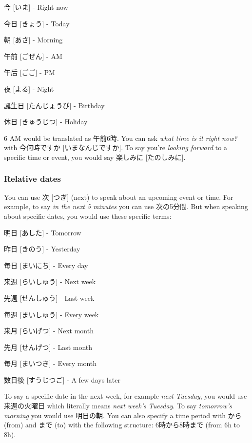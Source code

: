 \documentclass{article}
\begin{document}
\begin{CJK}{UTF8}{min}
\begin{multicols*}{3}
\begin{colorize}
\item 今 [いま] - Right now
\item 今日 [きょう] - Today
\item 朝 [あさ] - Morning
\item 午前 [ごぜん] - AM
\item 午后 [ごご] - PM
\item 夜 [よる] - Night
\item 誕生日 [たんじょうび] - Birthday
\item 休日 [きゅうじつ] - Holiday
\end{colorize}

6 AM would be translated as 午前6時. You can ask \textit{what time is it right now?} with 今何時ですか [いまなんじですか]. To say you're \textit{looking forward} to a specific time 
or event, you would say 楽しみに [たのしみに].

\subsubsection{Relative dates}

You can use 次 [つぎ] (next) to speak about an upcoming event or time. For example, to say \textit{in the next 5 minutes} you can use 次の5分間. But when speaking about specific 
dates, you would use these specific terms:

\begin{colorize}
\item 明日 [あした] - Tomorrow
\item 昨日 [きのう] - Yesterday
\item 毎日 [まいにち] - Every day
\item 来週 [らいしゅう] - Next week
\item 先週 [せんしゅう] - Last week
\item 毎週 [まいしゅう] - Every week
\item 来月 [らいげつ] - Next month
\item 先月 [せんげつ] - Last month
\item 毎月 [まいつき] - Every month
\item 数日後 [すうじつご] - A few days later
\end{colorize}

To say a specific date in the next week, for example \textit{next Tuesday}, you would use 来週の火曜日 which literally means \textit{next week's Tuesday}. To say \textit{tomorrow's 
morning} you would use 明日の朝. You can also specify a time period with から (from) and まで (to) with the following structure: 6時から8時まで (from 6h to 8h).


\end{multicols*}
\end{CJK}
\end{document}
